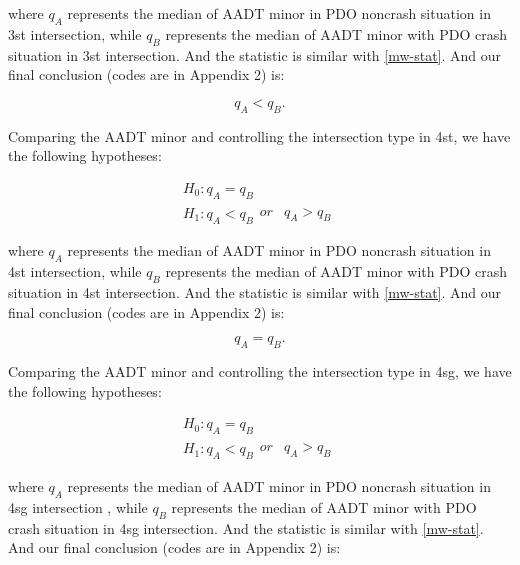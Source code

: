 \documentclass[11pt]{scrartcl} %
\begin{document}
where $q_A$ represents the median of AADT minor in PDO noncrash situation in 3st intersection, while $q_B$ represents the median of AADT minor with PDO crash situation in 3st intersection. And the statistic is similar with \eqref{mw-stat}. And our final conclusion (codes are in Appendix 2) is:

\begin{equation*}
{q_A} < {q_B}.
\end{equation*}

\par

Comparing the AADT minor and controlling the intersection type in 4st, we have the following hypotheses:

\begin{equation*}
\begin{array}{l}
{H_0}:{q_A} = {q_B}\\
{H_1}:{q_A} < {q_B}\begin{array}{*{20}{c}}
{or}&{{q_A} > {q_B}}
\end{array}
\end{array}
\end{equation*}

where $q_A$ represents the median of AADT minor in PDO noncrash situation in 4st intersection, while $q_B$ represents the median of AADT minor with PDO crash situation in 4st intersection. And the statistic is similar with \eqref{mw-stat}. And our final conclusion (codes are in Appendix 2) is:

\begin{equation*}
{q_A} = {q_B}.
\end{equation*}

\par

Comparing the AADT minor and controlling the intersection type in 4sg, we have the following hypotheses:

\begin{equation*}
\begin{array}{l}
{H_0}:{q_A} = {q_B}\\
{H_1}:{q_A} < {q_B}\begin{array}{*{20}{c}}
{or}&{{q_A} > {q_B}}
\end{array}
\end{array}
\end{equation*}

where $q_A$ represents the median of AADT minor in PDO noncrash situation in 4sg intersection , while $q_B$ represents the median of AADT minor with PDO crash situation in 4sg intersection. And the statistic is similar with \eqref{mw-stat}. And our final conclusion (codes are in Appendix 2) is:
\end{document}
